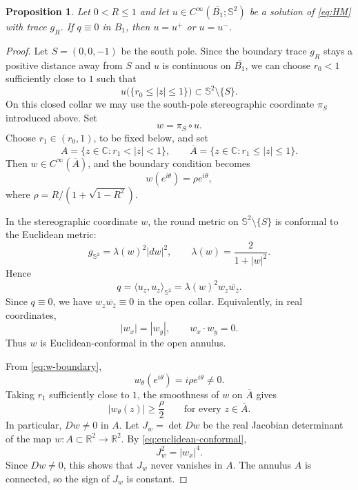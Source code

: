 \documentclass[11pt]{amsart}
\numberwithin{equation}{section}
\newtheorem{proposition}[theorem]{Proposition}
\theoremstyle{remark}
\newcommand{\R}{\mathbb{R}}
\newcommand{\C}{\mathbb{C}}
\newcommand{\Sph}{\mathbb{S}^2}
\begin{document}
\begin{proposition}\label{prop:conformal-classification}
Let $0<R\le1$ and let $u\in C^\infty(\overline{B_1};\Sph)$ be a solution of \eqref{eq:HM} with trace $g_R$. If $q\equiv0$ in $B_1$, then
$u=u^+$ or $u=u^-$.
\end{proposition}

\begin{proof}
Let $S=(0,0,-1)$ be the south pole. Since the boundary trace $g_R$ stays a positive distance away from $S$ and $u$ is continuous on
$\overline{B_1}$, we can choose $r_0<1$ sufficiently close to $1$ such that
\[
u\bigl(\{r_0\le |z|\le 1\}\bigr)\subset \Sph\setminus\{S\}.
\]
On this closed collar we may use the south-pole stereographic coordinate $\pi_S$ introduced above. Set
\[
w=\pi_S\circ u.
\]
Choose $r_1\in(r_0,1)$, to be fixed below, and set
\[
A=\{z\in\C:r_1<|z|<1\},
\qquad
\overline A=\{z\in\C:r_1\le |z|\le1\}.
\]
Then $w\in C^\infty(\overline A)$, and the boundary condition becomes
\begin{equation}\label{eq:w-boundary}
 w(e^{i\theta})=\rho e^{i\theta},
\end{equation}
where $\rho=R/(1+\sqrt{1-R^2})$.

In the stereographic coordinate $w$, the round metric on $\Sph\setminus\{S\}$ is conformal to the Euclidean metric:
\[
g_{\Sph}=\lambda(w)^2|dw|^2,
\qquad
\lambda(w)=\frac{2}{1+|w|^2}.
\]
Hence
\[
q=\langle u_z,u_z\rangle_{\Sph}=\lambda(w)^2 w_z\overline{w_{\bar z}}.
\]
Since $q\equiv0$, we have $w_z\overline{w_{\bar z}}\equiv0$ in the open collar. Equivalently, in real coordinates,
\begin{equation}\label{eq:euclidean-conformal}
|w_x|=|w_y|,
\qquad
w_x\cdot w_y=0.
\end{equation}
Thus $w$ is Euclidean-conformal in the open annulus.

From \eqref{eq:w-boundary},
\[
w_\theta(e^{i\theta})=i\rho e^{i\theta}\neq0.
\]
Taking $r_1$ sufficiently close to $1$, the smoothness of $w$ on $\overline A$ gives
\[
|w_\theta(z)|\ge \frac\rho2
\qquad\text{for every }z\in\overline A.
\]
In particular, $Dw\neq0$ in $A$. Let $J_w=\det Dw$ be the real Jacobian determinant of the map $w\colon A\subset\R^2\to\R^2$. By
\eqref{eq:euclidean-conformal},
\[
J_w^2=|w_x|^4.
\]
Since $Dw\neq0$, this shows that $J_w$ never vanishes in $A$. The annulus $A$ is connected, so the sign of $J_w$ is constant.


\end{proof}
\end{document}
